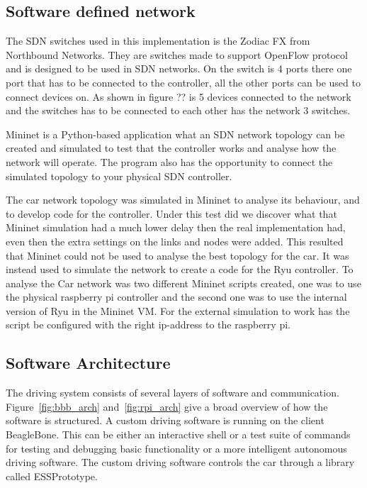 \documentclass[11pt, titlepage]{article} %
\begin{document}
\subsection{Software defined network}

The SDN switches used in this implementation is the Zodiac FX from Northbound Networks. They are switches made to support OpenFlow protocol and is designed to be used in SDN networks. On the switch is 4 ports there one port that has to be connected to the controller, all the other ports can be used to connect devices on. As shown in figure ?? is 5 devices connected to the network and the switches has to be connected to each other has the network 3 switches. 

Mininet is a Python-based application what an SDN network topology can be created and simulated to test that the controller works and analyse how the network will operate. The program also has the opportunity to connect the simulated topology to your physical SDN controller. 

The car network topology was simulated in Mininet to analyse its behaviour, and to develop code for the controller. Under this test did we discover what that Mininet simulation had a much lower delay then the real implementation had, even then the extra settings on the links and nodes were added. This resulted that Mininet could not be used to analyse the best topology for the car. It was instead used to simulate the network to create a code for the Ryu controller. To analyse the Car network was two different Mininet scripts created, one was to use the physical raspberry pi controller and the second one was to use the internal version of Ryu in the Mininet VM. For the external simulation to work has the script be configured with the right ip-address to the raspberry pi. 

\subsection{Software Architecture}
The driving system consists of several layers of software and communication. Figure~\ref{fig:bbb_arch} and~\ref{fig:rpi_arch} give a broad overview
of how the software is structured. A custom driving software is running on the client BeagleBone. This can be either an interactive shell or a test suite
of commands for testing and debugging basic functionality or a more intelligent autonomous driving software. The custom driving software controls
the car through a library called ESSPrototype.
\end{document}
